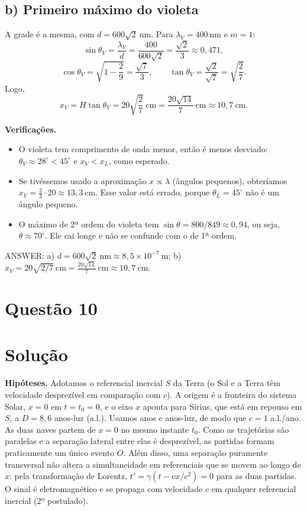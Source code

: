 \documentclass{article}%
\begin{document}
\subsection*{b) Primeiro máximo do violeta}

A grade é a mesma, com $d = 600\sqrt{2}\ \text{nm}$. Para $\lambda_V = 400\ \text{nm}$ e $m = 1$:
\[
\sin\theta_V = \frac{\lambda_V}{d} = \frac{400}{600\sqrt{2}} = \frac{\sqrt{2}}{3} \approx 0{,}471,
\]
\[
\cos\theta_V = \sqrt{1 - \frac{2}{9}} = \frac{\sqrt{7}}{3}, \qquad \tan\theta_V = \frac{\sqrt{2}}{\sqrt{7}} = \sqrt{\frac{2}{7}}.
\]
Logo,
\[
x_V = H\tan\theta_V = 20\sqrt{\frac{2}{7}}\ \text{cm} = \frac{20\sqrt{14}}{7}\ \text{cm} \approx 10{,}7\ \text{cm}.
\]

\textbf{Verificações.}
\begin{itemize}
\item O violeta tem comprimento de onda menor, então é menos desviado: $\theta_V \approx 28^\circ < 45^\circ$ e $x_V < x_L$, como esperado.
\item Se tivéssemos usado a aproximação $x \propto \lambda$ (ângulos pequenos), obteríamos $x_V = \tfrac{2}{3}\cdot 20 \approx 13{,}3\ \text{cm}$. Esse valor está errado, porque $\theta_L = 45^\circ$ não é um ângulo pequeno.
\item O máximo de 2ª ordem do violeta tem $\sin\theta = 800/849 \approx 0{,}94$, ou seja, $\theta \approx 70^\circ$. Ele cai longe e não se confunde com o de 1ª ordem.
\end{itemize}

ANSWER: a) $d = 600\sqrt{2}\ \text{nm} \approx 8{,}5\times 10^{-7}\ \text{m}$; b) $x_V = 20\sqrt{2/7}\ \text{cm} = \frac{20\sqrt{14}}{7}\ \text{cm} \approx 10{,}7\ \text{cm}$.%
\newpage%
\section*{Questão 10}

\section*{Solução}

\textbf{Hipóteses.} Adotamos o referencial inercial $S$ da Terra (o Sol e a Terra têm velocidade desprezível em comparação com $c$). A origem é a fronteira do sistema Solar, $x=0$ em $t=t_0=0$, e o eixo $x$ aponta para Sirius, que está em repouso em $S$, a $D=8{,}6$ anos-luz (a.l.). Usamos anos e anos-luz, de modo que $c=1$ a.l./ano. As duas naves partem de $x=0$ no mesmo instante $t_0$. Como as trajetórias são paralelas e a separação lateral entre elas é desprezível, as partidas formam praticamente um único evento $O$. Além disso, uma separação puramente transversal não altera a simultaneidade em referenciais que se movem ao longo de $x$: pela transformação de Lorentz, $t'=\gamma(t-vx/c^2)=0$ para as duas partidas. O sinal é eletromagnético e se propaga com velocidade $c$ em qualquer referencial inercial (2º postulado).
\end{document}
